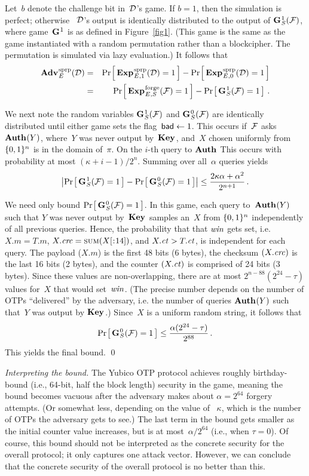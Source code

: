 Let~$b$ denote the challenge bit in~$\mathcal{D}$'s game. If $b=1$, then the
simulation is perfect; otherwise ~$\mathcal{D}$'s output is identically distributed
to the output of $\textbf{G}\hspace{0.5pt}^1_S(\mathcal{F})$, where game~$\textbf{G}\hspace{0.5pt}^1$ is as defined in
Figure~\ref{fig1}. (This game is the same as the \forge game instantiated with a random
permutation rather than a blockcipher. The permutation is simulated via lazy
evaluation.) It follows that
\begin{eqnarray*}
  \Adv{\sprp}_E(\advD) &=& \Prob{\Exp{\sprp}_{E,1}(\advD)\outputs\true} -
                           \Prob{\Exp{\sprp}_{E,0}(\advD)\outputs\true}\\
                       &=& \Prob{\Exp{\forge}_{E,S}(\advF)\outputs\true} -
                           \Prob{\G^1_S(\advF)\outputs\true}\,.
\end{eqnarray*}

We next note the random variables $\textbf{G}\hspace{0.5pt}^1_S(\mathcal{F})$ and $\textbf{G}\hspace{0.5pt}^0_S(\mathcal{F})$ are
identically distributed until either game sets the flag~$\mathsf{bad}\gets1$.
This occurs if~$\mathcal{F}$ asks $\textbf{Auth}\hspace{0.5pt}(Y)$, where~$Y$ was never output by~$\textbf{Key}\hspace{0.5pt}$,
and~$X$ chosen uniformly from~$\{0,1\}^n$ is in the domain of~$\pi$. On the $i$-th
query to $\textbf{Auth}\hspace{0.5pt}$ This occurs with probability at most $(\kappa + i - 1)/2^n$.
Summing over all~$\alpha$ queries yields
\[
  \left| \Pr\hspace{-1pt}\left[\,\textbf{G}\hspace{0.5pt}^1_S(\mathcal{F})=1\,\right] - \Pr\hspace{-1pt}\left[\,\textbf{G}\hspace{0.5pt}^0_S(\mathcal{F})=1\,\right]
  \right| \leq \frac{2\kappa\alpha + \alpha^2}{2^{n+1}}\,.
\]

We need only bound $\Pr\hspace{-1pt}\left[\,\textbf{G}\hspace{0.5pt}^0_S(\mathcal{F})=1\,\right]$. In this game, each query
to~$\textbf{Auth}\hspace{0.5pt}(Y)$ such that $Y$ was never output by~$\textbf{Key}\hspace{0.5pt}$ samples an~$X$ from
$\{0,1\}^n$ independently of all previous queries. Hence, the probability that
that $\mathit{win}$ gets set, i.e. $X.m = T.m$, $X.\crc=\checksum(\substr(X,,14))$, and
$X.\mathit{ct} > T.\mathit{ct}$, is independent for each query.
%
The payload ($X.m$) is the first 48 bits (6 bytes), the checksum $(X.\mathit{crc})$ is
the last 16 bits (2 bytes), and the counter $(X.\mathit{ct})$ is comprised of 24  bits
(3 bytes). Since these values are non-overlapping, there are at most
$2^{n-88}(2^{24}-\tau)$ values for~$X$ that would set~$\mathit{win}$. (The precise
number depends on the number of OTPs ``delivered'' by the adversary, i.e. the
number of queries $\textbf{Auth}\hspace{0.5pt}(Y)$ such that~$Y$ was output by $\textbf{Key}\hspace{0.5pt}$.) Since~$X$ is
a uniform random string, it follows
that
\[
  \Pr\hspace{-1pt}\left[\,\textbf{G}\hspace{0.5pt}^0_S(\mathcal{F})=1\,\right] \leq \frac{\alpha(2^{24}-\tau)}{2^{88}}\,.
\]
This yields the final bound.
%
\qed

\textit{Interpreting the bound.}
%
The Yubico OTP protocol achieves roughly birthday-bound (i.e., 64-bit, half
the block length) security in the \forge game, meaning the bound becomes vacuous
after the adversary makes about $\alpha=2^{64}$ forgery attempts. (Or somewhat
less, depending on the value of ~$\kappa$, which is the number of OTPs the
adversary gets to see.)
%
The last term in the bound gets smaller as the initial counter value
increases, but is at most~$\alpha/2^{64}$ (i.e., when $\tau=0$).
%
Of course, this bound should not be interpreted as the concrete security for the
overall protocol; it only captures one attack vector. However, we can conclude
that the concrete security of the overall protocol is no better than this.

